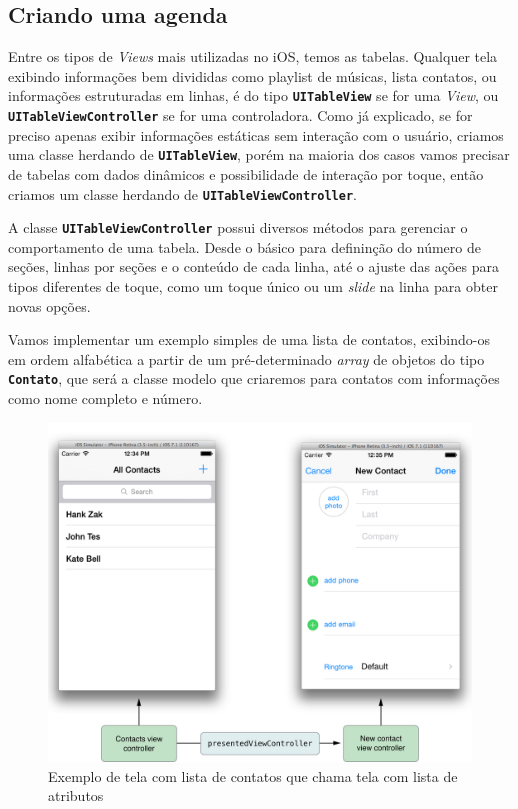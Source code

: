 \documentclass[a4paper,12pt,brazil,doubleside]{book}
\begin{document}
\begin{singlespace}
\section{Criando uma agenda}

Entre os tipos de \emph{Views} mais utilizadas no iOS, temos as tabelas. Qualquer tela exibindo informações bem divididas como playlist de músicas, lista contatos, ou informações estruturadas em linhas, é do tipo \texttt{\textbf{UITableView}} se for uma \emph{View}, ou \texttt{\textbf{UITableViewController}} se for uma controladora. Como já explicado, se for preciso apenas exibir informações estáticas sem interação com o usuário, criamos uma classe herdando de \texttt{\textbf{UITableView}}, porém na maioria dos casos vamos precisar de tabelas com dados dinâmicos e possibilidade de interação por toque, então criamos um classe herdando de \texttt{\textbf{UITableViewController}}.

A classe \texttt{\textbf{UITableViewController}} possui diversos métodos para gerenciar o comportamento de uma tabela. Desde o básico para defininção do número de seções, linhas por seções e o conteúdo de cada linha, até o ajuste das ações para tipos diferentes de toque, como um toque único ou um \emph{slide} na linha para obter novas opções.

Vamos implementar um exemplo simples de uma lista de contatos, exibindo-os em ordem alfabética a partir de um pré-determinado \emph{array} de objetos do tipo \texttt{\textbf{Contato}}, que será a classe modelo que criaremos para contatos com informações como nome completo e número.

\begin{figure}[H]
  \centering
  \includegraphics[width=.75\textwidth]{figuras/apple_table_view_controller_contatos.png}
  \caption{Exemplo de tela com lista de contatos que chama tela com lista de atributos}
  \label{fig:a}
\end{figure}


\end{singlespace}
\end{document}
